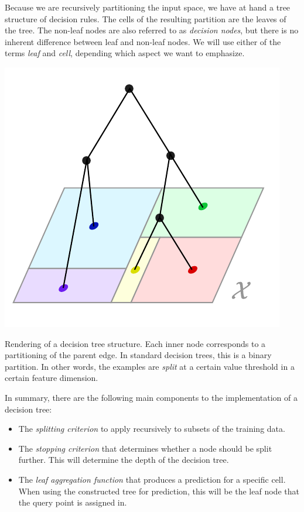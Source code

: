 \documentclass[../main.tex]{subfiles}
\begin{document}
Because we are recursively partitioning the input space, we have at hand a tree structure of decision rules. The cells of the resulting partition are the leaves of the tree. The non-leaf nodes are also referred to as \textit{decision nodes}, but there is no inherent difference between leaf and non-leaf nodes. We will use either of the terms \textit{leaf} and \textit{cell}, depending which aspect we want to emphasize.



\begin{marginfigure}
    \label{fig:decision-tree-partition}
    \includegraphics[width=\textwidth]{figma-illustrations/decision-tree}
    \caption{
        Rendering of a decision tree structure. Each inner node corresponds to a partitioning of the parent edge. In standard decision trees, this is a binary partition. In other words, the examples are \textit{split} at a certain value threshold in a certain feature dimension.    }
\end{marginfigure}

    

In summary, there are the following main components to the implementation of a decision tree:
\begin{itemize}
    \item The \textit{splitting criterion} to apply recursively to subsets of the training data.
    \item The \textit{stopping criterion} that determines whether a node should be split further. This will determine the depth of the decision tree.
    \item The \textit{leaf aggregation function} that produces a prediction for a specific cell. When using the constructed tree for prediction, this will be the leaf node that the query point is assigned in.
\end{itemize}
\end{document}
